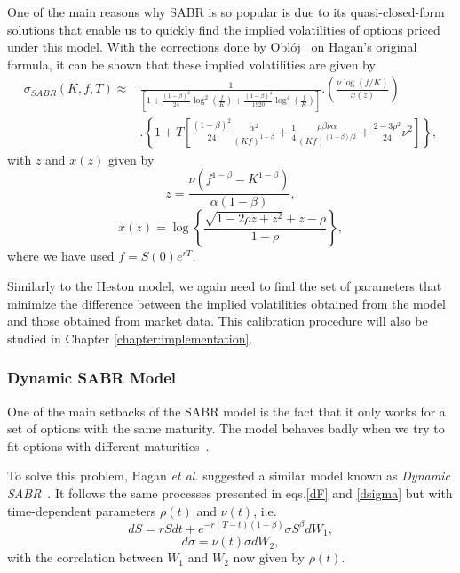 One of the main reasons why SABR is so popular is due to its quasi-closed-form solutions that enable us to quickly find the implied volatilities of options priced under this model. With the corrections done by Oblój~\cite{Obloj} on Hagan's original formula, it can be shown that these implied volatilities are given by
\begin{equation}\label{sabr}
\begin{split}
\sigma_{SABR}(K,f,T)\approx&\frac{1}{\displaystyle\left[1+\frac{(1-\beta)^2}{24}\log^2\left(\frac{f}{K}\right)+\frac{(1-\beta)^4}{1920}\log^4\left(\frac{f}{K}\right)\right]}.\left(\frac{\nu\log\left(f/K\right)}{x(z)}\right)\\
&.\left\{1+T\left[\frac{(1-\beta)^2}{24}\frac{\alpha^2}{(Kf)^{1-\beta}}+\frac{1}{4}\frac{\rho\beta\nu\alpha}{(Kf)^{(1-\beta)/2}}+\frac{2-3\rho^2}{24}\nu^2\right]\right\},
\end{split}
\end{equation}
\noindent with $z$ and $x(z)$ given by
\begin{equation}
z=\frac{\nu\left(f^{1-\beta}-K^{1-\beta}\right)}{\alpha(1-\beta)},
\end{equation}
\begin{equation}
x(z)=\log\left\{\frac{\sqrt{1-2\rho z+z^2}+z-\rho}{1-\rho}\right\},
\end{equation}
\noindent where we have used $f=S(0)e^{rT}$.

Similarly to the Heston model, we again need to find the set of parameters that minimize the difference between the implied volatilities obtained from the model and those obtained from market data. This calibration procedure will also be studied in Chapter \ref{chapter:implementation}.


\subsubsection{Dynamic SABR Model}
One of the main setbacks of the SABR model is the fact that it only works for a set of options with the same maturity. The model behaves badly when we try to fit options with different maturities~\cite{Hagan}. 

To solve this problem, Hagan \textit{et al.} suggested a similar model known as \emph{Dynamic SABR}~\cite{Hagan}. It follows the same processes presented in eqs.\eqref{dF} and \eqref{dsigma} but with time-dependent parameters $\rho(t)$ and $\nu(t)$, i.e.
\begin{equation}\label{dF2}
dS=rSdt+e^{-r(T-t)(1-\beta)}\sigma S^\beta dW_1,
\end{equation}
\begin{equation}\label{dsigma2}
d\sigma=\nu(t)\sigma dW_2,
\end{equation}
\noindent with the correlation between $W_1$ and $W_2$ now given by $\rho(t)$.

